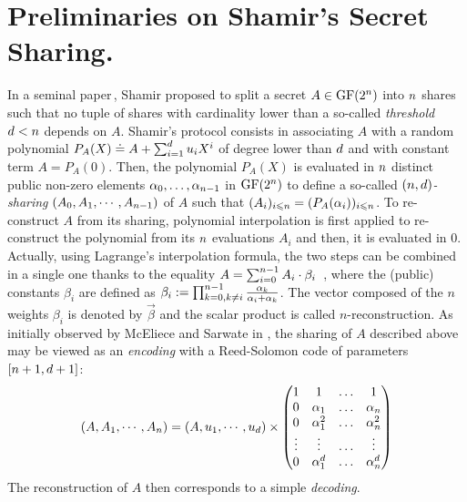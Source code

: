 \documentclass{llncs}
\begin{document}
\section{Preliminaries on Shamir's Secret Sharing.}

In a seminal paper\,\cite{Sha79}, Shamir proposed to split a secret $A\in \GFn$ into $\nbShares$ shares such that
no tuple of shares with cardinality lower than a so-called {\em threshold} $\order<\nbShares$ depends on $A$. Shamir's
protocol consists in associating $A$ with a random polynomial $P_A(X)\doteq A + \sum_{i=1}^{\order}\polyCoef X^i$ of degree lower than $\order$ and with constant term $A=P_A(0)$. Then, the polynomial $P_A(X)$ is evaluated in $\nbShares$ distinct public non-zero elements $\pubElt[0], \ldots, \pubElt[n-1]$ in $\GFn$ to define a so-called {\em $(\nbShares,\order)$-sharing} $(A_0,A_1,\cdots,A_{\nbShares-1})$ of $A$ such that $(A_i)_{i\leqslant \nbShares}=(P_A(\alpha_i))_{i\leqslant \nbShares}$. To re-construct $A$ from its sharing, polynomial interpolation is first applied to re-construct the polynomial from its $\nbShares$ evaluations $A_i$ and then, it is evaluated in $0$. Actually, using Lagrange's
interpolation formula, the two steps can be combined in a single one thanks to the equality $ A=\sum_{i=0}^{\nbShares-1} A_i \cdot \beta_i\enspace$,  where the (public) constants $\beta_i$ are defined as $\beta_i:=\prod_{k=0,k\neq i}^{\nbShares-1} \frac{\alpha_k}{\alpha_i+\alpha_k}$. The vector composed of the $n$ weights $\beta_i$ is denoted by $\vec \beta$ and the scalar product is called $n$-reconstruction. As initially observed by McEliece and Sarwate in \cite{MS81}, the sharing of $A$ described above may be viewed as an {\em encoding} with a Reed-Solomon code of parameters $[\nbShares + 1,\order + 1]$:
$$
(A,A_1,\cdots,A_{\nbShares}) = (A,\polyCoef[1],\cdots,\polyCoef[\order])\times 
\left(\begin{matrix}
1 & 1 & \hdots & 1 \\
0 & \pubElt[1] & \hdots & \pubElt[\nbShares] \\
0 & \pubElt[1]^2 & \hdots & \pubElt[\nbShares]^2 \\
\vdots & \vdots & \hdots & \vdots \\
0 & \pubElt[1]^{\order} & \hdots & \pubElt[\nbShares]^{\order} 
\end{matrix}
\right)
$$
The reconstruction of $A$ then corresponds to a simple {\em decoding}.
\vspace{3mm}
\end{document}
